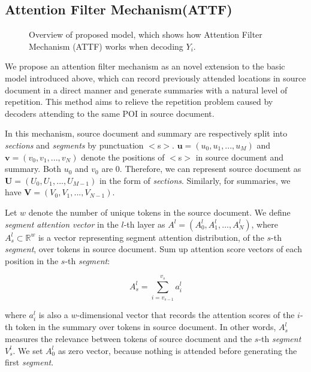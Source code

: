 \subsection{Attention Filter Mechanism(ATTF)}
\label{sec:attf}

\begin{figure}[th]
	\centering
	\caption{Overview of proposed model, which shows how Attention Filter Mechanism (ATTF) works when decoding $Y_i$.}
	\label{fig:model_main}
\end{figure}


\label{sec:attnf}
We propose an attention filter mechanism as an novel extension to the basic model introduced above,
which can record previously attended locations 
in source document in a direct manner and generate summaries 
with a natural level of repetition. 
This method aims to relieve the repetition problem caused by 
decoders attending to the same POI%
in source document.

In this mechanism, source document and summary are respectively split into 
\textit{sections} and \textit{segments} by punctuation $<$s$>$.
$\mathbf{u}=(u_{0},u_{1},...,u_{M})$ 
and $\mathbf{v}=(v_{0},v_{1},...,v_{N})$
denote the positions of $<$s$>$ in source document and summary.
Both $u_{0}$ and $v_{0}$ are $0$.
Therefore, we can represent source document as $\mathbf{U}=(U_{0},U_{1},...,U_{M-1})$ in the form of \textit{sections}. Similarly, for summaries, we have $\mathbf{V}=(V_{0},V_{1},...,V_{N-1})$.

Let $w$ denote the number of unique tokens in the source document.
We define \textit{segment attention vector} in the $l$-th layer as 
$A^{l} = (A_{0}^{l}, A_{1}^{l},..., A_{N}^{l})$, 
where $A_s^l\subset \mathbb{R}^{w}$ is a vector representing 
segment attention distribution, of the $s$-th \textit{segment},
over tokens in source document. Sum up attention score vectors 
of each position in the $s$-th \textit{segment}:

\begin{equation}
    A_{s}^{l} = \sum_{i=v_{s-1}}^{v_{s}}a_{i}^{l}
\end{equation}

where $a_i^l$ is also a $w$-dimensional vector that records 
the attention scores of the $i$-th token in the summary over 
tokens in source document. In other words, $ A_{s}^{l}$ 
measures the relevance between tokens of source document and 
the $s$-th \textit{segment} $V_s^{l}$.
We set $A_{0}^{l}$ as zero vector, because nothing is attended before generating the first \textit{segment}. 


